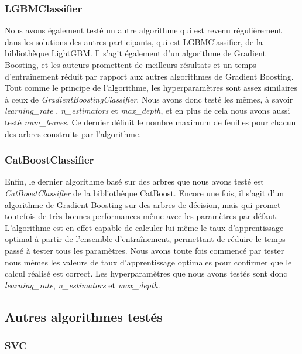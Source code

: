 \documentclass[a4paper]{article}
\begin{document}
    \subsubsection{LGBMClassifier}

    Nous avons également testé un autre algorithme qui est revenu régulièrement dans les solutions des autres participants, qui est LGBMClassifier,
    de la bibliothèque LightGBM. Il s'agit également d'un algorithme de Gradient Boosting, et les auteurs promettent de meilleurs résultats et un temps 
    d'entraînement réduit par rapport aux autres algorithmes de Gradient Boosting.
    Tout comme le principe de l'algorithme, les hyperparamètres sont assez similaires à ceux de {\it GradientBoostingClassifier}. Nous avons donc testé les
    mêmes, à savoir {\it learning\_rate }, {\it n\_estimators} et {\it max\_depth}, et en plus de cela nous avons aussi testé {\it num\_leaves}. Ce dernier définit
    le nombre maximum de feuilles pour chacun des arbres construits par l'algorithme.

    \subsubsection{CatBoostClassifier}

    Enfin, le dernier algorithme basé sur des arbres que nous avons testé est {\it CatBoostClassifier} de la bibliothèque CatBoost.
    Encore une fois, il s'agit d'un algorithme de Gradient Boosting sur des arbres de décision, mais qui promet toutefois 
    de très bonnes performances même avec les paramètres par défaut.
    L'algorithme est en effet capable de calculer lui même le taux d'apprentissage optimal à partir de l'ensemble d'entraînement, permettant de
    réduire le temps passé à tester tous les paramètres. Nous avons toute fois commencé par tester nous mêmes les valeurs 
    de taux d'apprentissage optimales pour confirmer que le calcul réalisé est correct.
    Les hyperparamètres que nous avons testés sont donc {\it learning\_rate}, {\it n\_estimators} et {\it max\_depth}.

    \subsection{Autres algorithmes testés}

    \subsubsection{SVC}
\end{document}
